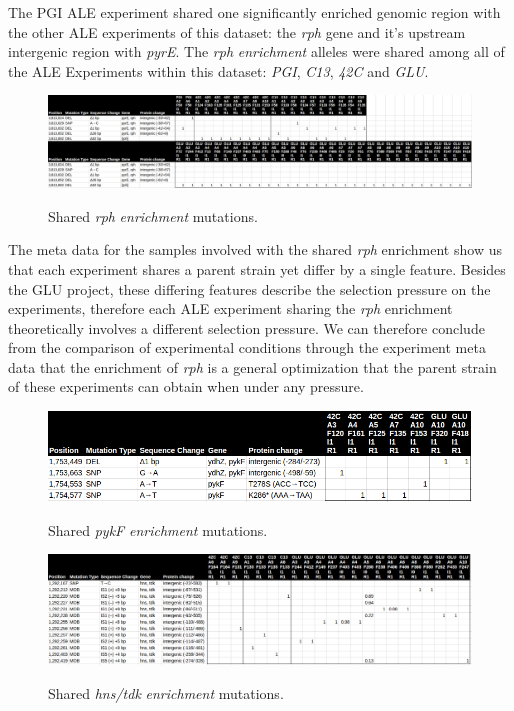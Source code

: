 \documentclass[12pt,final,masters,chapterheads]{ucsd}  %
\begin{document}
%
%

The PGI ALE experiment shared one significantly enriched genomic region with the other ALE experiments of this dataset: the \textit{rph} gene and it's upstream intergenic region with \textit{pyrE}. The \textit{rph} \textit{enrichment} alleles were shared among all of the ALE Experiments within this dataset: \textit{PGI}, \textit{C13}, \textit{42C} and \textit{GLU}. 

\begin{figure}[h!]
  \caption{Shared \textit{rph} \textit{enrichment} mutations.}
  \centering
  \includegraphics[width=\textwidth]{rph_pyrE_shared_enrich_mut.png}
  \label{fig:rph_pyrE_shared_enrich_mut}
\end{figure}

The meta data for the samples involved with the shared \textit{rph} enrichment show us that each experiment shares a parent strain yet differ by a single feature. Besides the GLU project, these differing features describe the selection pressure on the experiments, therefore each ALE experiment sharing the \textit{rph} enrichment theoretically involves a different selection pressure. We can therefore conclude from the comparison of experimental conditions through the experiment meta data that the enrichment of \textit{rph} is a general optimization that the parent strain of these experiments can obtain when under any pressure.

\begin{figure}[h!]
  \caption{Shared \textit{pykF} \textit{enrichment} mutations.}
  \centering
  \includegraphics[width=\textwidth]{pykF_shared_enrich_mut.png}
  \label{fig:pykF_shared_enrich_mut}
\end{figure}

\begin{figure}[h!]
  \caption{Shared \textit{hns/tdk} \textit{enrichment} mutations.}
  \centering
  \includegraphics[width=\textwidth]{hns_tdk_shared_enrich_mut.png}
  \label{fig:hns_tdk_shared_enrich_mut}
\end{figure}
\end{document}
